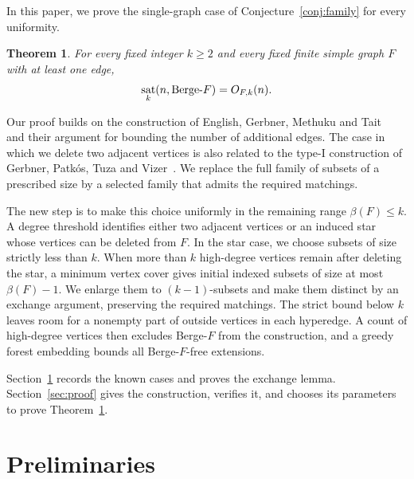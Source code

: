 \documentclass[10pt,a4paper]{article}
\numberwithin{equation}{section}
\newtheorem{theorem}{Theorem}[section]
\theoremstyle{definition}
\theoremstyle{plain}
\DeclareMathOperator{\sat}{sat}
\newcommand{\BF}{\textup{Berge-}F}
\begin{document}
In this paper, we prove the single-graph case of
Conjecture~\ref{conj:family} for every uniformity.


\begin{theorem}\label{thm:main}
For every fixed integer $k\ge2$ and every fixed finite simple graph $F$
with at least one edge,
\[
 \sat_k(n,\BF)=O_{F,k}(n).
\]
\end{theorem}


Our proof builds on the construction of English, Gerbner, Methuku and
Tait~\cite[Construction~2.1]{EGMT} and their argument for bounding the
number of additional edges. The case in which we delete two adjacent
vertices is also related to the type-I construction of Gerbner,
Patk\'os, Tuza and Vizer~\cite[proof of Theorem~1.3]{GPTV}.
We replace the full family of subsets of a prescribed size by a selected
family that admits the required matchings.

The new step is to make this choice uniformly in the remaining range
$\beta(F)\le k$. A degree threshold identifies either two adjacent
vertices or an induced star whose vertices can be deleted from $F$.
In the star case, we choose subsets of size strictly less than $k$.
When more than $k$ high-degree vertices remain after deleting the star,
a minimum vertex cover gives initial indexed subsets of size at most
$\beta(F)-1$. We enlarge them to $(k-1)$-subsets and make them distinct
by an exchange argument, preserving the required matchings.
The strict bound below $k$ leaves room for a nonempty part of outside
vertices in each hyperedge. A count of high-degree vertices then excludes
Berge-$F$ from the construction, and a greedy forest embedding bounds
all Berge-$F$-free extensions.

Section~\ref{sec:prelim} records the known cases and proves the exchange
lemma. Section~\ref{sec:proof} gives the construction, verifies it, and
chooses its parameters to prove Theorem~\ref{thm:main}.

\section{Preliminaries}\label{sec:prelim}
\end{document}
